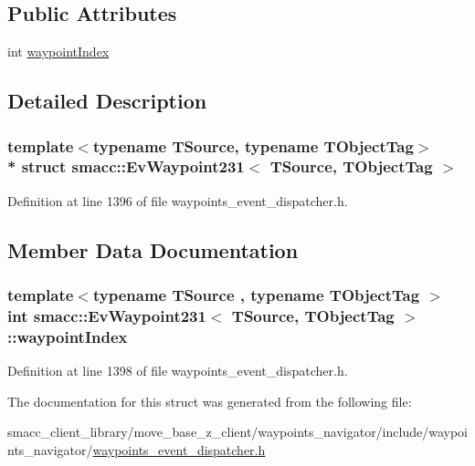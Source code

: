\subsection*{Public Attributes}
\begin{DoxyCompactItemize}
\item 
int \hyperlink{structsmacc_1_1EvWaypoint231_a39b8dbdd38c0bc0ccc0208a2bcf8e219}{waypoint\+Index}
\end{DoxyCompactItemize}


\subsection{Detailed Description}
\subsubsection*{template$<$typename T\+Source, typename T\+Object\+Tag$>$\\*
struct smacc\+::\+Ev\+Waypoint231$<$ T\+Source, T\+Object\+Tag $>$}



Definition at line 1396 of file waypoints\+\_\+event\+\_\+dispatcher.\+h.



\subsection{Member Data Documentation}
\subsubsection[{\texorpdfstring{waypoint\+Index}{waypointIndex}}]{\setlength{\rightskip}{0pt plus 5cm}template$<$typename T\+Source , typename T\+Object\+Tag $>$ int {\bf smacc\+::\+Ev\+Waypoint231}$<$ T\+Source, T\+Object\+Tag $>$\+::waypoint\+Index}\hypertarget{structsmacc_1_1EvWaypoint231_a39b8dbdd38c0bc0ccc0208a2bcf8e219}{}\label{structsmacc_1_1EvWaypoint231_a39b8dbdd38c0bc0ccc0208a2bcf8e219}


Definition at line 1398 of file waypoints\+\_\+event\+\_\+dispatcher.\+h.



The documentation for this struct was generated from the following file\+:\begin{DoxyCompactItemize}
\item 
smacc\+\_\+client\+\_\+library/move\+\_\+base\+\_\+z\+\_\+client/waypoints\+\_\+navigator/include/waypoints\+\_\+navigator/\hyperlink{waypoints__event__dispatcher_8h}{waypoints\+\_\+event\+\_\+dispatcher.\+h}\end{DoxyCompactItemize}
